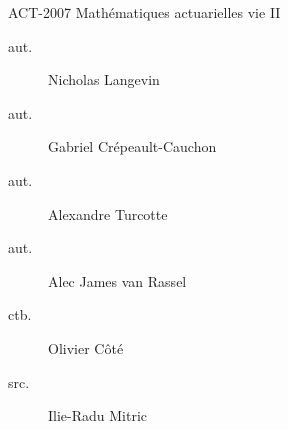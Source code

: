 \begin{contrib}{ACT-2007\: Mathématiques actuarielles vie II}
\begin{description}
	\item[aut.] Nicholas Langevin
	\item[aut.] Gabriel Crépeault-Cauchon 
	\item[aut.] Alexandre Turcotte 
	\item[aut.] Alec James van Rassel
	\item[ctb.] Olivier Côté
	\item[src.] Ilie-Radu Mitric
\end{description}
\end{contrib}
